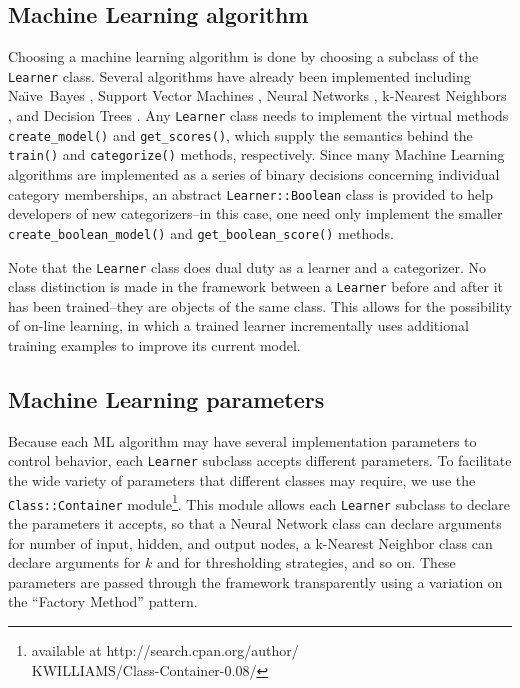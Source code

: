 \documentclass[twocolumn]{article}
\newcommand{\naive}{Na\"\i ve}
\newcommand{\method}[1]{\texttt{#1()}}
\newcommand{\class}[1]{\texttt{#1}}
\begin{document}
\subsection*{Machine Learning algorithm}
Choosing a machine learning algorithm is done
by choosing a subclass of the \class{Learner} class.  Several
algorithms have already been implemented including \naive\ Bayes
\cite{lewis:98}, Support Vector Machines \cite{scholkopf:99}
\cite{cortes:95}, Neural Networks \cite{calvo:01} \cite{yang:99},
k-Nearest Neighbors \cite{yang:99}, and Decision Trees
\cite{quinlan:89}.  Any \class{Learner} class needs to implement the
virtual methods \method{create\_model} and \method{get\_scores},
which supply the semantics behind the \method{train} and
\method{categorize} methods, respectively.  Since many Machine
Learning algorithms are implemented as a series of binary decisions
concerning individual category memberships, an abstract
\class{Learner::Boolean} class is provided to help developers of new
categorizers--in this case, one need only implement the smaller
\method{create\_boolean\_model} and \method{get\_boolean\_score}
methods.

Note that the \class{Learner} class does dual duty as a learner and a
categorizer.  No class distinction is made in the framework between a
\class{Learner} before and after it has been trained--they are
objects of the same class.  This allows for the possibility of on-line
learning, in which a trained learner incrementally uses additional
training examples to improve its current model.

\subsection*{Machine Learning parameters}
Because each ML algorithm may have several implementation parameters
to control behavior, each \class{Learner} subclass accepts different
parameters.  To facilitate the wide variety of parameters that
different classes may require, we use the \class{Class::Container}
module\footnote{available at http://search.cpan.org/author/\\
KWILLIAMS/Class-Container-0.08/}.  This module allows each
\class{Learner} subclass to declare the parameters it accepts, so
that a Neural Network class can declare arguments for number of input,
hidden, and output nodes, a k-Nearest Neighbor class can declare
arguments for $k$ and for thresholding strategies, and so on.  These
parameters are passed through the framework transparently using a
variation on the ``Factory Method'' pattern. \cite{gamma:95}
\end{document}
